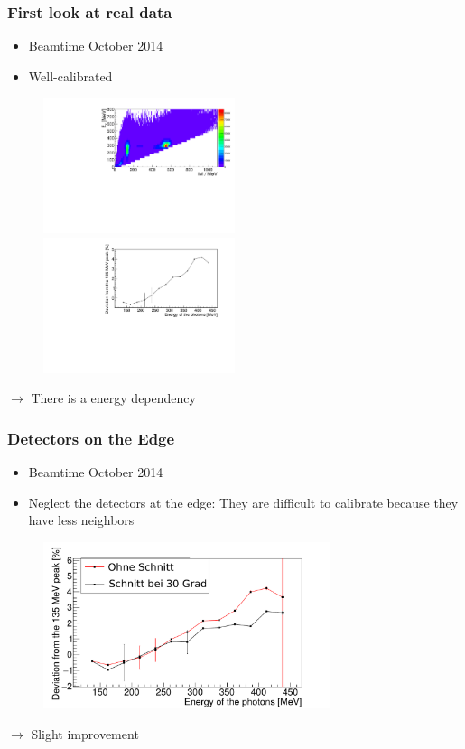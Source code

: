 \documentclass[slidestop,compress,mathserif]{beamer}
\begin{document}
\begin{frame}
	\frametitle{First look at real data}
	
	\begin{itemize}
		\item Beamtime October 2014
		\item Well-calibrated 
\end{itemize}
	
		\begin{figure}
		
		\includegraphics[width=0.50\textwidth]{Pictures/20171904Uncharged2DHist}
		\hfill
		\includegraphics[width=0.50\textwidth]{Pictures/20170405StrahlzeitDeviatoinNoCut}
		
	\end{figure}
$\rightarrow$ There is a energy dependency	
\end{frame}

\begin{frame}
	\frametitle{Detectors on the Edge}
	
	\begin{itemize}
		\item Beamtime October 2014
		\item Neglect the detectors at the edge: They are difficult to calibrate because they have less neighbors
	\end{itemize}

\begin{figure}
	\includegraphics[width=0.75\textwidth]{Pictures/20170405StrahlzeitBothDeviation}
	

\end{figure}
	$\rightarrow$ Slight improvement	
\end{frame}
\end{document}
